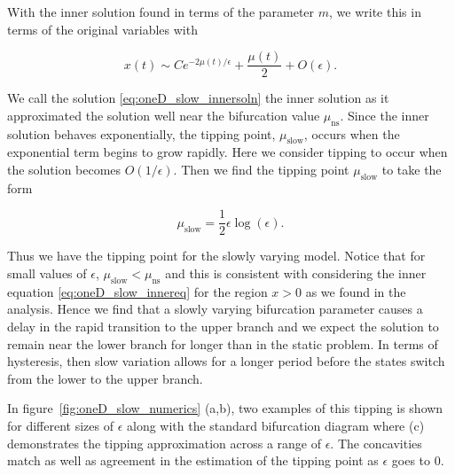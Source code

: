 With the inner solution found in terms of the parameter $m$, we write this in terms of the original variables with

\begin{equation}\label{eq:oneD_slow_innersoln}
x(t)\sim Ce^{-2\mu(t)/\epsilon}+\frac{\mu(t)}{2}+O(\epsilon).
\end{equation}

We call the solution \eqref{eq:oneD_slow_innersoln} the inner solution as it approximated the solution well near the bifurcation value $\mu_{\text{ns}}$. Since the inner solution behaves exponentially, the tipping point, $\mu_{\text{slow}}$, occurs when the exponential term begins to grow rapidly. Here we consider tipping to occur when the solution becomes $O(1/\epsilon)$. Then we find the tipping point $\mu_{\text{slow}}$ to take the form

\begin{equation}\label{eq:oneD_slow_tipping}
\mu_{\text{slow}}= \frac{1}{2}\epsilon \log (\epsilon).
\end{equation}

\indent Thus we have the tipping point for the slowly varying model. Notice that for small values of $\epsilon$, $\mu_{\text{slow}}<\mu_{\text{ns}}$ and this is consistent with considering the inner equation \eqref{eq:oneD_slow_innereq} for the region $x>0$ as we found in the analysis. Hence we find that a slowly varying bifurcation parameter causes a delay in the rapid transition to the upper branch and we expect the solution to remain near the lower branch for longer than in the static problem. In terms of hysteresis, then slow variation allows for a longer period before the states switch from the lower to the upper branch.

\indent In figure~\ref{fig:oneD_slow_numerics} (a,b), two examples of this tipping is shown for different sizes of $\epsilon$ along with the standard bifurcation diagram where (c) demonstrates the tipping approximation across a range of $\epsilon$. The concavities match as well as agreement in the estimation of the tipping point as $\epsilon$ goes to 0.

